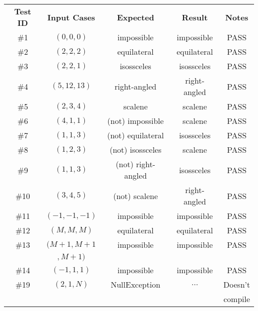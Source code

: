 \begin{center}
  \begin{tabular}{ccccc}
    \textbf{Test ID} & \textbf{Input Cases} & \textbf{Expected} & \textbf{Result} & \textbf{Notes} \\
    \#1  & $(0,0,0)$   & impossible    & impossible   & PASS  \\
    \#2  & $(2,2,2)$   & equilateral   & equilateral  & PASS  \\
    \#3  & $(2,2,1)$   & isossceles    & isossceles   & PASS  \\
    \#4  & $(5,12,13)$ & right-angled  & right-angled & PASS  \\
    \#5  & $(2,3,4)$   & scalene       & scalene      & PASS  \\
    \#6  & $(4,1,1)$   & (not) impossible   & scalene      & PASS \\
    \#7  & $(1,1,3)$   & (not) equilateral  & isossceles   & PASS \\
    \#8  & $(1,2,3)$   & (not) isossceles   & scalene      & PASS \\
    \#9  & $(1,1,3)$   & (not) right-angled & isossceles   & PASS \\
    \#10 & $(3,4,5)$   & (not) scalene      & right-angled & PASS \\
    \#11 & $(-1,-1,-1)$ & impossible    & impossible  & PASS \\
    \#12 & $(M,M,M)$    & equilateral   & equilateral & PASS \\
    \#13 & $(M+1,M+1$   & impossible    & impossible  & PASS \\
         & $,M+1)$ \\
    \#14 & $(-1,1,1)$   & impossible    & impossible  & PASS \\
    \#19 & $(2,1,N)$    & NullException & $\dots$     & Doesn't \\
         &              &               &             & compile \\
  \end{tabular}
\end{center}
